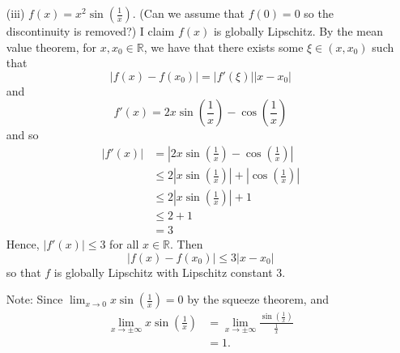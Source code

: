 \documentclass{article}
\begin{document}
\begin{itemize}
\begin{itemize}
        \item[(iii)] $f(x) = x^2 \sin(\frac{1}{x})$.
        \newline\newline
        (Can we assume that $f(0) = 0$ so the discontinuity is removed?) I claim $f(x)$ is globally Lipschitz. By the mean value theorem, for $x,x_0 \in \mathbb{R}$, we have that there exists some $\xi \in (x,x_0)$ such that
        \[|f(x) - f(x_0)| = |f'(\xi)||x - x_0|\]
        and 
        \[f'(x) = 2x\sin\left(\frac{1}{x}\right) - \cos\left(\frac{1}{x}\right)\]
        and so
        \begin{align*}
            |f'(x)| &= \left|2x\sin\left(\frac{1}{x}\right) - \cos\left(\frac{1}{x}\right)\right|\\
            &\leq 2\left|x\sin\left(\frac{1}{x}\right)\right| + \left|\cos\left(\frac{1}{x}\right)\right|\\
            &\leq 2\left|x\sin\left(\frac{1}{x}\right)\right| + 1\\
            &\leq 2 + 1\\
            &= 3
        \end{align*}
        Hence, $|f'(x)| \leq 3$ for all $x \in \mathbb{R}$. Then 
        \[|f(x) - f(x_0)| \leq 3|x - x_0|\]
        so that $f$ is globally Lipschitz with Lipschitz constant 3.
        \newline

        Note: Since $\lim_{x \to 0} x\sin\left(\frac{1}{x}\right) = 0$ by the squeeze theorem, and 
        \begin{align*}
            \lim_{x \to \pm \infty}x\sin\left(\frac{1}{x}\right) &= \lim_{x \to \pm \infty} \frac{\sin\left(\frac{1}{x}\right)}{\frac{1}{x}}\\
            &= 1.
        \end{align*}
        

        
    \end{itemize}



\end{itemize}
\end{document}
